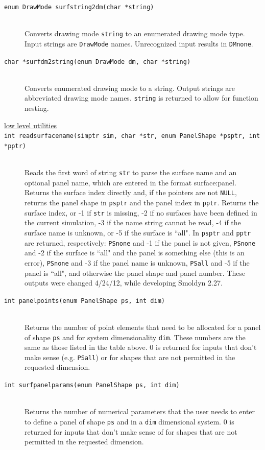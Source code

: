 \documentclass {scrbook}
\newcommand {\ttt} {\texttt}
\begin{document}
\begin{description}
\item[\ttt{enum DrawMode surfstring2dm(char *string)}]
\hfill \\
Converts drawing mode \ttt{string} to an enumerated drawing mode type. Input strings are \ttt{DrawMode} names. Unrecognized input results in \ttt{DMnone}.

\item[\ttt{char *surfdm2string(enum DrawMode dm, char *string)}]
\hfill \\
Converts enumerated drawing mode to a string. Output strings are abbreviated drawing mode names. \ttt{string} is returned to allow for function nesting.

\item[\underline{low level utilities}]

\item[\ttt{int readsurfacename(simptr sim, char *str, enum PanelShape *psptr, int *pptr)}]
\hfill \\
Reads the first word of string \ttt{str} to parse the surface name and an optional panel name, which are entered in the format surface:panel. Returns the surface index directly and, if the pointers are not \ttt{NULL}, returns the panel shape in \ttt{psptr} and the panel index in \ttt{pptr}. Returns the surface index, or -1 if \ttt{str} is missing, -2 if no surfaces have been defined in the current simulation, -3 if the name string cannot be read, -4 if the surface name is unknown, or -5 if the surface is ``all". In \ttt{psptr} and \ttt{pptr} are returned, respectively: \ttt{PSnone} and -1 if the panel is not given, \ttt{PSnone} and -2 if the surface is ``all" and the panel is something else (this is an error), \ttt{PSnone} and -3 if the panel name is unknown, \ttt{PSall} and -5 if the panel is ``all", and otherwise the panel shape and panel number. These outputs were changed 4/24/12, while developing Smoldyn 2.27.

\item[\ttt{int panelpoints(enum PanelShape ps, int dim)}]
\hfill \\
Returns the number of point elements that need to be allocated for a panel of shape \ttt{ps} and for system dimensionality \ttt{dim}. These numbers are the same as those listed in the table above. 0 is returned for inputs that don't make sense (e.g. \ttt{PSall}) or for shapes that are not permitted in the requested dimension.

\item[\ttt{int surfpanelparams(enum PanelShape ps, int dim)}]
\hfill \\
Returns the number of numerical parameters that the user needs to enter to define a panel of shape \ttt{ps} and in a \ttt{dim} dimensional system. 0 is returned for inputs that don't make sense of for shapes that are not permitted in the requested dimension.


\end{description}
\end{document}
